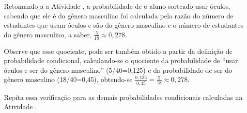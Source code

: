 Retomando a a Atividade , a probabilidade de o aluno sorteado usar óculos, sabendo que ele é do gênero masculino foi calculada pela razão do número de estudantes que usam óculos e são do gênero masculino e o número de estudantes do gênero masculino, a saber, \(\frac{5}{18}\approx 0,278\).

Observe que esse quociente, pode ser também obtido a partir da definição de probabilidade condicional, calculando-se o quociente da probabilidade de “usar óculos e ser do gênero masculino” (5/40=0,125) e da probabilidade de ser do gênero masculino (18/40=0,45), obtendo-se \(\frac{0,125}{0,45}=\frac{5}{18}\approx 0,278\).

Repita essa verificação para as demais probabilidades condicionais calculadas na Atividade .

